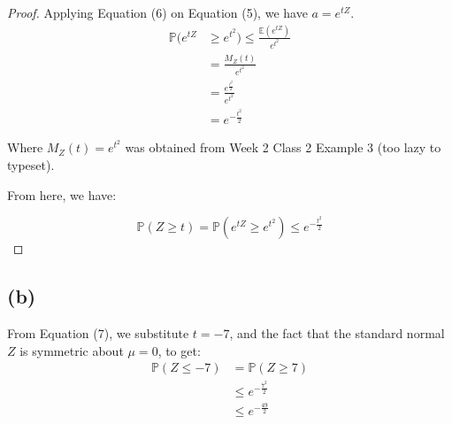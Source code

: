 \documentclass[12pt]{article}
\begin{document}
\begin{proof} Applying Equation (6) on Equation (5), we have $a = e^{tZ}$. 
\begin{align*}
    \mathbb{P}(e^{tZ} &\geq e^{t^{2}}) \leq \frac{ \mathbb{E}(e^{tZ})}{e^{t^{2}}} \\ 
    &= \frac{M_Z (t)}{e^{t^{2}}} \\ 
    &= \frac{e^{\frac{t^{2}}{2}}}{e^{t^{2}}} \\ 
    &= e^{-\frac{t^{2}}{2}}
\end{align*}

\noindent Where $M_Z (t) = e^{t^{2}}$ was obtained from Week 2 Class 2 Example 3 (too lazy to typeset).

\noindent From here, we have:

\begin{equation}
    \boxed{ \mathbb{P}(Z \geq t) = \mathbb{P}(e^{tZ} \geq e^{t^{2}}) \leq e^{-\frac{t^{2}}{2}}}
\end{equation}

\end{proof}

\subsection*{(b)}
From Equation (7), we substitute $t = -7$, and the fact that the standard normal $Z$ is symmetric about $\mu = 0$, to get: 
\begin{align*}
    \mathbb{P}(Z \leq -7) &= \mathbb{P}(Z \geq 7) \\ 
    &\leq  e^{-\frac{7^{2}}{2}} \\ 
    &\boxed{\leq  e^{-\frac{49}{2}}} \\ 
\end{align*}
\end{document}

